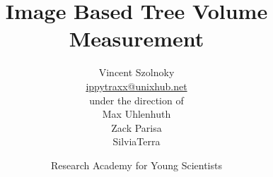 

\title{
Image Based Tree Volume Measurement
}

\author{
Vincent Szolnoky\\
\url{ippytraxx@unixhub.net}
\vspace{0.5in}\\
under the direction of\\
Max Uhlenhuth\\
Zack Parisa \\
SilviaTerra
\vspace{1in}
}


\date{
Research Academy for Young Scientists\\
\raysfinalpaperdate
}
